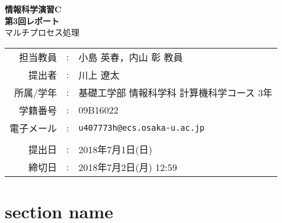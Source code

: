 \documentclass[a4j]{jarticle}
\makeatletter
\newcommand{\lectureName}{情報科学演習C}
\newcommand{\reportNumber}{3}
\newcommand{\reportTitle}{マルチプロセス処理}
\newcommand{\teacherName}{小島 英春，内山 彰 教員}
\newcommand{\deadline}{2018年7月2日(月) 12:59}
\newcommand{\studentName}{川上 遼太}
\newcommand{\studentAff}{基礎工学部 情報科学科 計算機科学コース 3年}
\newcommand{\studentID}{09B16022}
\newcommand{\studentEmail}{u407773h@ecs.osaka-u.ac.jp}
\newcommand{\submitted}{2018年7月1日(日)}
\makeatother
\begin{document}
\begin{titlepage}
\mbox{\vspace{10cm}}

\begin{center}
{\Huge\bfseries
\lectureName \\
第\reportNumber{}回レポート} \\
\vspace{1cm}
{\Large \reportTitle}
\vspace{5cm}

{\large
\begin{tabular}{rcl}
担当教員 & : & \teacherName \\
提出者   & : & \studentName \\
所属/学年   & : & \studentAff\\
学籍番号 & : & \studentID \\
電子メール & : & \texttt{\studentEmail}\\
\\
提出日 & : & \submitted \\
締切日 & : & \deadline
\end{tabular}
}
\end{center}
\end{titlepage}

\tableofcontents
\newpage

\section{}


\appendix %
\section{section name}
\end{document}
